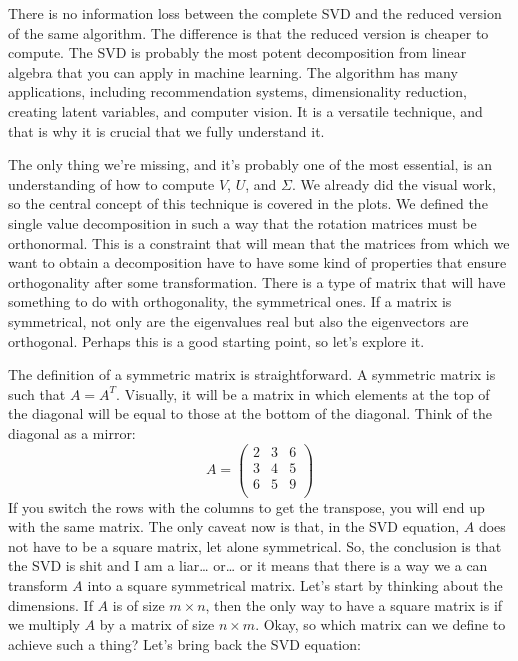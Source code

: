 \documentclass[600paper, 11pt,twoside,openany]{kdp}
\begin{document}
\par 
\vspace{-3pt}
\indent There is no information loss between the complete SVD and the reduced version of the same algorithm. The difference is that the reduced version is cheaper to compute. The SVD is probably the most potent decomposition from linear algebra that you can apply in machine learning. The algorithm has many applications, including recommendation systems, dimensionality reduction, creating latent variables, and computer vision. It is a versatile technique, and that is why it is crucial that we fully understand it.
\par 
\vspace{-3pt}
\indent The only thing we’re missing, and it’s probably one of the most essential, is an understanding of how to compute $V$, $U$, and $\Sigma$. We already did the visual work, so the central concept of this technique is covered in the plots. We defined the single value decomposition in such a way that the rotation matrices must be orthonormal. This is a constraint that will mean that the matrices from which we want to obtain a decomposition have to have some kind of properties that ensure orthogonality after some transformation. There is a type of matrix that will have something to do with orthogonality, the symmetrical ones. If a matrix is symmetrical, not only are the eigenvalues real but also the eigenvectors are orthogonal. Perhaps this is a good starting point, so let’s explore it. 
\par 
\vspace{-3pt}
\indent The definition of a symmetric matrix is straightforward. A symmetric matrix is such that $A=A^T$. Visually, it will be a matrix in which elements at the top of the diagonal will be equal to those at the bottom of the diagonal. Think of the diagonal as a mirror:
\[A = \begin{pmatrix}
2&3&6 \\
3&4&5 \\
6&5&9 \\
\end{pmatrix}
\]
\indent If you switch the rows with the columns to get the transpose, you will end up with the same matrix. The only caveat now is that, in the SVD equation, $A$ does not have to be a square matrix, let alone symmetrical. So, the conclusion is that the SVD is shit and I am a liar… or… or it means that there is a way we a can transform $A$ into a square symmetrical matrix. Let’s start by thinking about the dimensions. If $A$ is of size $m \times n$, then the only way to have a square matrix is if we multiply $A$ by a matrix of size $n \times m$. Okay, so which matrix can we define to achieve such a thing? Let’s bring back the SVD equation:
\end{document}
